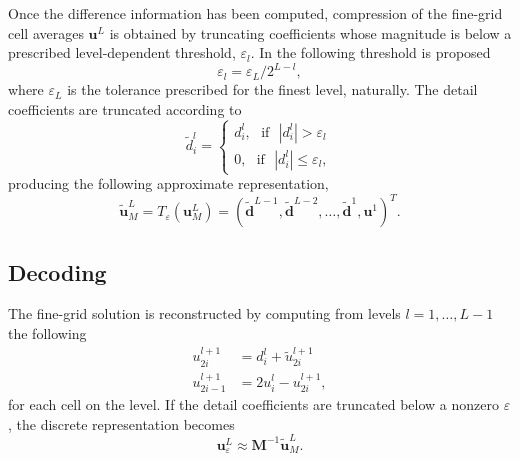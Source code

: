 \documentclass[]{article}
\begin{document}
        Once the difference information has been computed, compression of the
        fine-grid cell averages $\bm{u}^{L}$ is obtained by truncating
        coefficients whose magnitude is below a prescribed level-dependent
        threshold, $\varepsilon_{l}$.  In \cite{harten1994} the following
        threshold is proposed
        \begin{equation}
            \varepsilon_{l} = \varepsilon_{L} / 2^{L-l},
        \end{equation}
        where $\varepsilon_{L}$ is the tolerance prescribed for the finest
        level, naturally.  The detail coefficients are truncated according to
        \begin{equation}
            \tilde{d}^{l}_{i} =
                \begin{cases}
                    d^{l}_{i}, \text{ } \text{if} \text{ } |d^{l}_{i}| > \varepsilon_{l} \\
                    0, \text{ } \text{if} \text{ } |d^{l}_{i}| \leq
                    \varepsilon_{l},
                \end{cases}
        \end{equation}
        producing the following approximate representation,
        \begin{equation}
            \tilde{\bm{u}}^{L}_{M} = T_{\varepsilon}(\bm{u}^{L}_{M}) = \left(
            \tilde{\bm{d}}^{L-1}, \tilde{\bm{d}}^{L-2},
            \dots, \tilde{\bm{d}}^{1}, \bm{u}^{1} \right)^{T}.
        \end{equation}
        
    \subsection*{Decoding}

        The fine-grid solution is reconstructed by computing from levels
        $l=1,\dots,L-1$ the following
        \begin{align}
            u_{2i}^{l+1} & = d_{i}^{l} + \tilde{u}_{2i}^{l+1} \\
            u_{2i-1}^{l+1} & = 2 u_{i}^{l} - u_{2i}^{l+1},
        \end{align}
        for each cell on the level.  If the detail coefficients are truncated
        below a nonzero $\varepsilon$, the discrete representation becomes
        \begin{equation}
            \bm{u}^{L}_{\varepsilon} \approx \bm{M}^{-1} \tilde{\bm{u}}^{L}_{M}.
        \end{equation}
\end{document}
